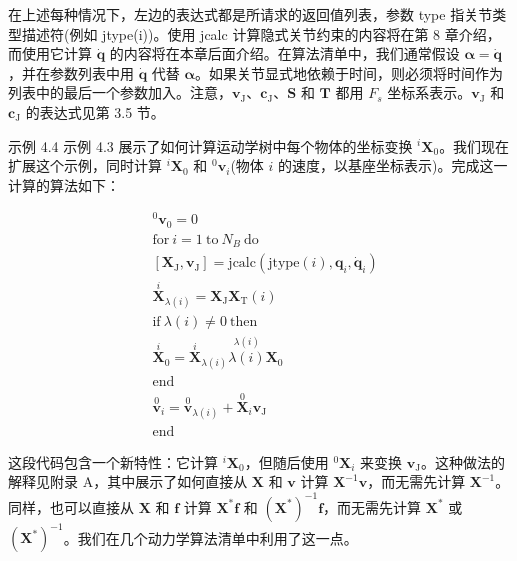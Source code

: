 \documentclass[10pt,a4paper]{book}
\theoremstyle{thmstyle} %
\theoremstyle{defstyle} %
\theoremstyle{prostyle} %
\begin{document}
在上述每种情况下，左边的表达式都是所请求的返回值列表，参数 type 指关节类型描述符(例如 jtype(i))。使用 jcalc 计算隐式关节约束的内容将在第 8 章介绍，而使用它计算 $\dot{\boldsymbol{q}}$ 的内容将在本章后面介绍。在算法清单中，我们通常假设 $\boldsymbol{\alpha}=\dot{\boldsymbol{q}}$，并在参数列表中用 $\dot{\boldsymbol{q}}$ 代替 $\boldsymbol{\alpha}$。如果关节显式地依赖于时间，则必须将时间作为列表中的最后一个参数加入。注意，$\boldsymbol{v}_{\mathrm{J}}$、$\boldsymbol{c}_{\mathrm{J}}$、$\boldsymbol{S}$ 和 $\boldsymbol{T}$ 都用 $F_{s}$ 坐标系表示。$\boldsymbol{v}_{\mathrm{J}}$ 和 $\boldsymbol{c}_{\mathrm{J}}$ 的表达式见第 3.5 节。



示例 4.4 示例 4.3 展示了如何计算运动学树中每个物体的坐标变换 $^{i}\mathbf{X}_{0}$。我们现在扩展这个示例，同时计算 $^{i}\mathbf{X}_{0}$ 和 $^{0}\mathbf{v}_{i}$(物体 $i$ 的速度，以基座坐标表示)。完成这一计算的算法如下：



$$
\begin{array}{rl} & { ^{0}\boldsymbol{v}_0 = 0} \\& { \mathrm{for~} i = 1 \mathrm{~to~} N_{B} \mathrm{~do~} } \\& { \left[ \boldsymbol{X}_{\mathrm{J}}, \boldsymbol{v}_{\mathrm{J}} \right] = \mathrm{jcalc}(\mathrm{jtype}(i), \boldsymbol{q}_{i}, \dot{\boldsymbol{q}}_{i})} \\& { \stackrel{i}{\boldsymbol{X}}_{\lambda(i)} = \boldsymbol{X}_{\mathrm{J}} \boldsymbol{X}_{\mathrm{T}}(i)} \\& { \mathrm{if~}\lambda(i) \neq 0 \mathrm{~then~} } \\& { \stackrel{i}{\boldsymbol{X}}_{0} = \stackrel{i}{\boldsymbol{X}}_{\lambda(i)} \stackrel{\lambda(i)}{\lambda(i)} \boldsymbol{X}_{0}} \\& { \mathrm{end~} } \\& { \stackrel{0}{\boldsymbol{v}}_{i} = \stackrel{0}{\boldsymbol{v}}_{\lambda(i)} + \stackrel{0}{\boldsymbol{X}}_{i} \boldsymbol{v}_{\mathrm{J}} } \\& { \mathrm{end~} } \end{array}
$$



这段代码包含一个新特性：它计算 $^{i}\mathbf{X}_{0}$，但随后使用 $^{0}\mathbf{X}_{i}$ 来变换 $\mathbf{v}_{\mathrm{J}}$。这种做法的解释见附录 A，其中展示了如何直接从 $\mathbf{X}$ 和 $\mathbf{v}$ 计算 $\mathbf{X}^{-1}\mathbf{v}$，而无需先计算 $\mathbf{X}^{-1}$。同样，也可以直接从 $\mathbf{X}$ 和 $\mathbf{f}$ 计算 $\mathbf{X}^{*}\mathbf{f}$ 和 $(\mathbf{X}^{*})^{-1}\mathbf{f}$，而无需先计算 $\mathbf{X}^{*}$ 或 $(\mathbf{X}^{*})^{-1}$。我们在几个动力学算法清单中利用了这一点。
\end{document}
